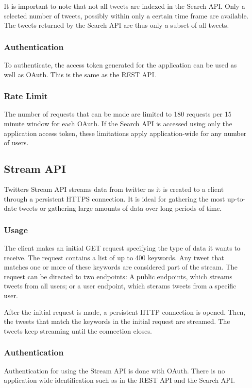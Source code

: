 It is important to note that not all tweets are indexed in the Search API. Only a selected number of tweets, possibly within only a certain time frame are available. The tweets returned by the Search API are thus only a subset of all tweets.\cite{twitter-search-api-timeframe}

\subsubsection{Authentication}
To authenticate, the access token generated for the application can be used as well as OAuth. This is the same as the REST API. \cite{twitter-rest-api}

\subsubsection{Rate Limit}
The number of requests that can be made are limited to 180 requests per 15 minute window for each OAuth. If the Search API is accessed using only the application access token, these limitations apply application-wide for any number of users.\cite{twitter-rate-limiting}

\subsection{Stream API}
Twitters Stream API streams data from twitter as it is created to a client through a persistent HTTPS connection. It is ideal for gathering the most up-to-date tweets or gathering large amounts of data over long periods of time.

\subsubsection{Usage}
The client makes an initial GET request specifying the type of data it wants to receive. The request contains a list of up to 400 keywords. Any tweet that matches one or more of these keywords are considered part of the stream. The request can be directed to two endpoints: A public endpoints, which streams tweets from all users; or a user endpoint, which sterams tweets from a specific user.

After the initial request is made, a persistent HTTP connection is opened. Then, the tweets that match the keywords in the initial request are streamed. The tweets keep streaming until the connection closes.

\subsubsection{Authentication}
Authentication for using the Stream API is done with OAuth. There is no application wide identification such as in the REST API and the Search API.

